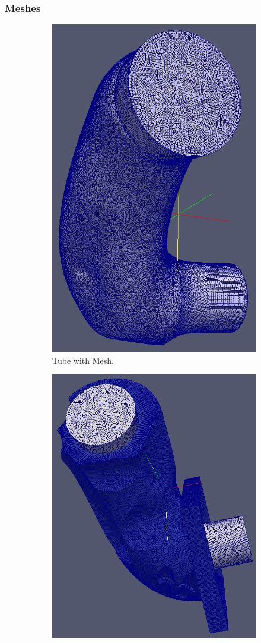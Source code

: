 \documentclass[10pt,xcolor=table,english]{beamer}   %
\begin{document}
\begin{frame}
    \frametitle{Meshes}
    \begin{figure}
        \begin{subfigure}{.49\textwidth}
            \centering
            \includegraphics[width=.7\linewidth]{Tube_with_Mesh}
            \caption{Tube with Mesh.}
        \end{subfigure}
        \begin{subfigure}{.49\textwidth}
            \centering
            \includegraphics[width=.85\linewidth]{Geometrical_Constraint_with_Mesh}

\end{subfigure}
\end{figure}
\end{frame}
\end{document}
